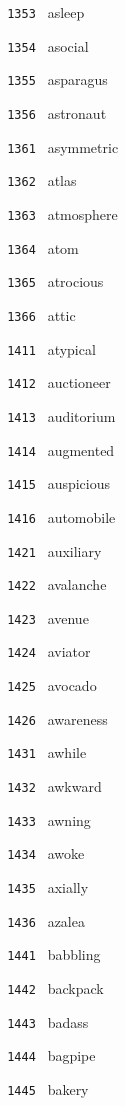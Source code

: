 \documentclass[11pt]{article}
\begin{document}
\begin{multicols}{6}
\noindent \texttt{ 1353 } asleep  \par
\noindent \texttt{ 1354 } asocial  \par
\noindent \texttt{ 1355 } asparagus  \par
\noindent \texttt{ 1356 } astronaut  \par
\noindent \texttt{ 1361 } asymmetric  \par
\noindent \texttt{ 1362 } atlas  \par
\noindent \texttt{ 1363 } atmosphere  \par
\noindent \texttt{ 1364 } atom  \par
\noindent \texttt{ 1365 } atrocious  \par
\noindent \texttt{ 1366 } attic  \par
\noindent \texttt{ 1411 } atypical  \par
\noindent \texttt{ 1412 } auctioneer  \par
\noindent \texttt{ 1413 } auditorium  \par
\noindent \texttt{ 1414 } augmented  \par
\noindent \texttt{ 1415 } auspicious  \par
\noindent \texttt{ 1416 } automobile  \par
\noindent \texttt{ 1421 } auxiliary  \par
\noindent \texttt{ 1422 } avalanche  \par
\noindent \texttt{ 1423 } avenue  \par
\noindent \texttt{ 1424 } aviator  \par
\noindent \texttt{ 1425 } avocado  \par
\noindent \texttt{ 1426 } awareness  \par
\noindent \texttt{ 1431 } awhile  \par
\noindent \texttt{ 1432 } awkward  \par
\noindent \texttt{ 1433 } awning  \par
\noindent \texttt{ 1434 } awoke  \par
\noindent \texttt{ 1435 } axially  \par
\noindent \texttt{ 1436 } azalea  \par
\noindent \texttt{ 1441 } babbling  \par
\noindent \texttt{ 1442 } backpack  \par
\noindent \texttt{ 1443 } badass  \par
\noindent \texttt{ 1444 } bagpipe  \par
\noindent \texttt{ 1445 } bakery  \par

\end{multicols}
\end{document}

